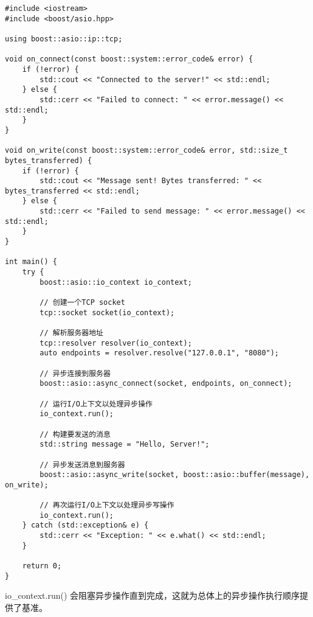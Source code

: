 \begin{lstlisting}[frame=shadowbox]
#include <iostream>
#include <boost/asio.hpp>

using boost::asio::ip::tcp;

void on_connect(const boost::system::error_code& error) {
	if (!error) {
		std::cout << "Connected to the server!" << std::endl;
	} else {
		std::cerr << "Failed to connect: " << error.message() << std::endl;
	}
}

void on_write(const boost::system::error_code& error, std::size_t bytes_transferred) {
	if (!error) {
		std::cout << "Message sent! Bytes transferred: " << bytes_transferred << std::endl;
	} else {
		std::cerr << "Failed to send message: " << error.message() << std::endl;
	}
}

int main() {
	try {
		boost::asio::io_context io_context;
		
		// 创建一个TCP socket
		tcp::socket socket(io_context);
		
		// 解析服务器地址
		tcp::resolver resolver(io_context);
		auto endpoints = resolver.resolve("127.0.0.1", "8080");
		
		// 异步连接到服务器
		boost::asio::async_connect(socket, endpoints, on_connect);
		
		// 运行I/O上下文以处理异步操作
		io_context.run();
		
		// 构建要发送的消息
		std::string message = "Hello, Server!";
		
		// 异步发送消息到服务器
		boost::asio::async_write(socket, boost::asio::buffer(message), on_write);
		
		// 再次运行I/O上下文以处理异步写操作
		io_context.run();
	} catch (std::exception& e) {
		std::cerr << "Exception: " << e.what() << std::endl;
	}
	
	return 0;
}
\end{lstlisting}
io\_context.run() 会阻塞异步操作直到完成，这就为总体上的异步操作执行顺序提供了基准。
